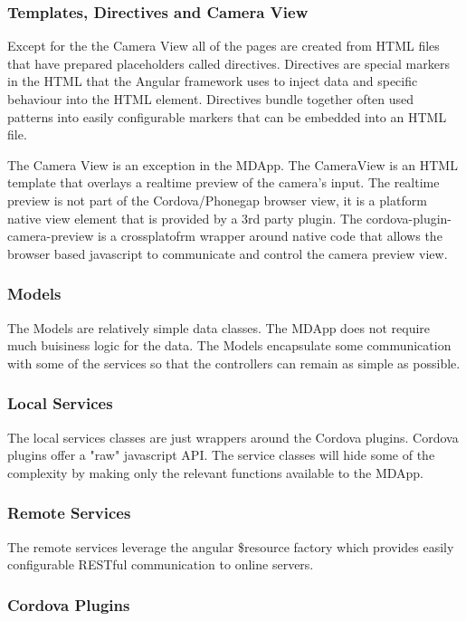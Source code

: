 \subsubsection{Templates, Directives and Camera View}
Except for the the Camera View all of the pages are created from HTML files that have prepared placeholders called directives. Directives are special markers in the HTML that the Angular framework uses to inject data and specific behaviour into the HTML element. Directives bundle together often used patterns into easily configurable markers that can be embedded into an HTML file.

The Camera View is an exception in the MDApp. The CameraView is an HTML template that overlays a realtime preview of the camera’s input. The realtime preview is not part of the Cordova/Phonegap browser view, it is a platform native view element that is provided by a 3rd party plugin. The cordova-plugin-camera-preview is a crossplatofrm wrapper around native code that allows the browser based javascript to communicate and control the camera preview view.

\subsubsection{Models}
The Models are relatively simple data classes. The MDApp does not require much buisiness logic for the data. The Models encapsulate some communication with some of the services so that the controllers can remain as simple as possible.

\subsubsection{Local Services}
The local services classes are just wrappers around the Cordova plugins. Cordova plugins offer a "raw" javascript API. The service classes will hide some of the complexity by making only the relevant functions available to the MDApp.

\subsubsection{Remote Services}
The remote services leverage the angular \$resource factory which provides easily configurable RESTful communication to online servers.

\subsubsection{Cordova Plugins}

